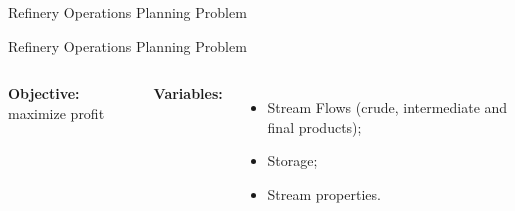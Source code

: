 \begin{frame}{Refinery Operations Planning Problem}
\end{frame}


\begin{frame}{Refinery Operations Planning Problem}

	\begin{columns}
		
		{\bf Objective:} maximize profit
		
		{\bf Variables:}
			\begin{itemize}
				\item Stream Flows {\footnotesize(crude, intermediate and final products)};
			    \item Storage;
			    \item Stream properties.
		    \end{itemize}
\end{columns}
\end{frame}
